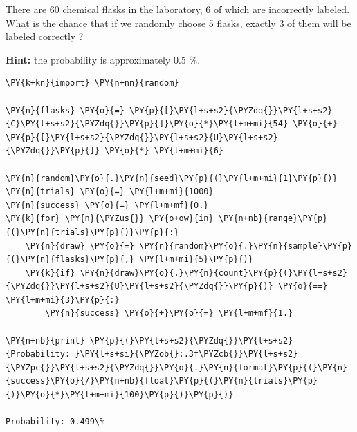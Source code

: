 \begin{Exercise}[title={(Monte Carlo Simulation}]
There are 60 chemical flasks in the laboratory, 6 of which are incorrectly labeled. What is the chance that if we randomly choose 5 flasks, exactly 3 of them will be labeled correctly ?

\textbf{Hint:} the probability is approximately 0.5 \%.
\end{Exercise}

\begin{Answer}
\begin{codebox}[size=fbox, boxrule=1pt, colback=cellbackground, colframe=cellborder]
\begin{Verbatim}[commandchars=\\\{\}]
\PY{k+kn}{import} \PY{n+nn}{random}

\PY{n}{flasks} \PY{o}{=} \PY{p}{[}\PY{l+s+s2}{\PYZdq{}}\PY{l+s+s2}{C}\PY{l+s+s2}{\PYZdq{}}\PY{p}{]}\PY{o}{*}\PY{l+m+mi}{54} \PY{o}{+} \PY{p}{[}\PY{l+s+s2}{\PYZdq{}}\PY{l+s+s2}{U}\PY{l+s+s2}{\PYZdq{}}\PY{p}{]} \PY{o}{*} \PY{l+m+mi}{6}

\PY{n}{random}\PY{o}{.}\PY{n}{seed}\PY{p}{(}\PY{l+m+mi}{1}\PY{p}{)}
\PY{n}{trials} \PY{o}{=} \PY{l+m+mi}{1000}
\PY{n}{success} \PY{o}{=} \PY{l+m+mf}{0.}
\PY{k}{for} \PY{n}{\PYZus{}} \PY{o+ow}{in} \PY{n+nb}{range}\PY{p}{(}\PY{n}{trials}\PY{p}{)}\PY{p}{:}
    \PY{n}{draw} \PY{o}{=} \PY{n}{random}\PY{o}{.}\PY{n}{sample}\PY{p}{(}\PY{n}{flasks}\PY{p}{,} \PY{l+m+mi}{5}\PY{p}{)}
    \PY{k}{if} \PY{n}{draw}\PY{o}{.}\PY{n}{count}\PY{p}{(}\PY{l+s+s2}{\PYZdq{}}\PY{l+s+s2}{U}\PY{l+s+s2}{\PYZdq{}}\PY{p}{)} \PY{o}{==} \PY{l+m+mi}{3}\PY{p}{:}
        \PY{n}{success} \PY{o}{+}\PY{o}{=} \PY{l+m+mf}{1.}
        
\PY{n+nb}{print} \PY{p}{(}\PY{l+s+s2}{\PYZdq{}}\PY{l+s+s2}{Probability: }\PY{l+s+si}{\PYZob{}:.3f\PYZcb{}}\PY{l+s+s2}{\PYZpc{}}\PY{l+s+s2}{\PYZdq{}}\PY{o}{.}\PY{n}{format}\PY{p}{(}\PY{n}{success}\PY{o}{/}\PY{n+nb}{float}\PY{p}{(}\PY{n}{trials}\PY{p}{)}\PY{o}{*}\PY{l+m+mi}{100}\PY{p}{)}\PY{p}{)}

Probability: 0.499\%
\end{Verbatim}
\end{codebox}
\end{Answer}

